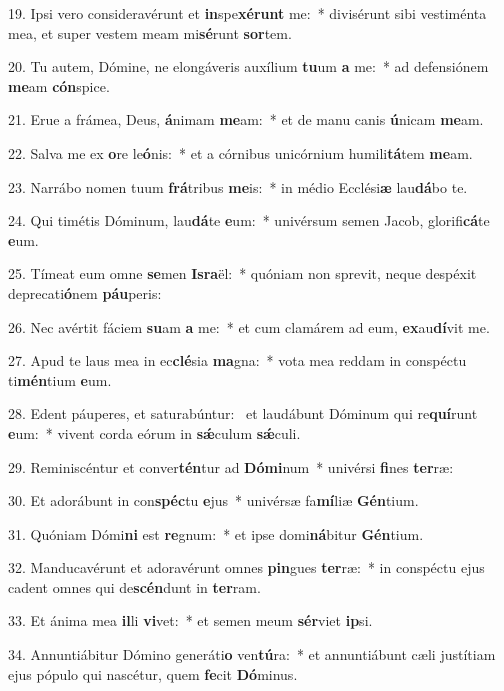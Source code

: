 19. Ipsi vero consideravérunt et \textbf{in}spe\textbf{xé}\textbf{runt} me:~*  divisérunt sibi vestiménta mea, et super vestem meam mi\textbf{sé}runt \textbf{sor}tem.\

20. Tu autem, Dómine, ne elongáveris auxílium \textbf{tu}um \textbf{a} me:~*  ad defensiónem \textbf{me}am \textbf{cón}spice.\

21. Erue a frámea, Deus, \textbf{á}nimam \textbf{me}am:~*  et de manu canis \textbf{ú}nicam \textbf{me}am.\

22. Salva me ex \textbf{o}re le\textbf{ó}nis:~*  et a córnibus unicórnium humili\textbf{tá}tem \textbf{me}am.\

23. Narrábo nomen tuum \textbf{frá}tribus \textbf{me}is:~*  in médio Ecclési\textbf{æ} lau\textbf{dá}bo te.\

24. Qui timétis Dóminum, lau\textbf{dá}te \textbf{e}um:~*  univérsum semen Jacob, glorifi\textbf{cá}te \textbf{e}um.\

25. Tímeat eum omne \textbf{se}men \textbf{Is}\textbf{ra}ël:~*  quóniam non sprevit, neque despéxit deprecati\textbf{ó}nem \textbf{páu}peris:\

26. Nec avértit fáciem \textbf{su}am \textbf{a} me:~*  et cum clamárem ad eum, \textbf{ex}au\textbf{dí}vit me.\

27. Apud te laus mea in ec\textbf{clé}sia \textbf{ma}gna:~*  vota mea reddam in conspéctu ti\textbf{mén}tium \textbf{e}um.\

28. Edent páuperes, et saturabúntur: \dag\  et laudábunt Dóminum qui re\textbf{quí}runt \textbf{e}um:~*  vivent corda eórum in \textbf{sǽ}culum \textbf{sǽ}culi.\

29. Reminiscéntur et conver\textbf{tén}tur ad \textbf{Dó}\textbf{mi}num~*  univérsi \textbf{fi}nes \textbf{ter}ræ:\

30. Et adorábunt in con\textbf{spéc}tu \textbf{e}jus~*  univérsæ fa\textbf{mí}liæ \textbf{Gén}tium.\

31. Quóniam Dómi\textbf{ni} est \textbf{re}gnum:~*  et ipse domi\textbf{ná}bitur \textbf{Gén}tium.\

32. Manducavérunt et adoravérunt omnes \textbf{pin}gues \textbf{ter}ræ:~*  in conspéctu ejus cadent omnes qui de\textbf{scén}dunt in \textbf{ter}ram.\

33. Et ánima mea \textbf{il}li \textbf{vi}vet:~*  et semen meum \textbf{sér}viet \textbf{ip}si.\

34. Annuntiábitur Dómino generáti\textbf{o} ven\textbf{tú}ra:~*  et annuntiábunt cæli justítiam ejus pópulo qui nascétur, quem \textbf{fe}cit \textbf{Dó}minus.\

